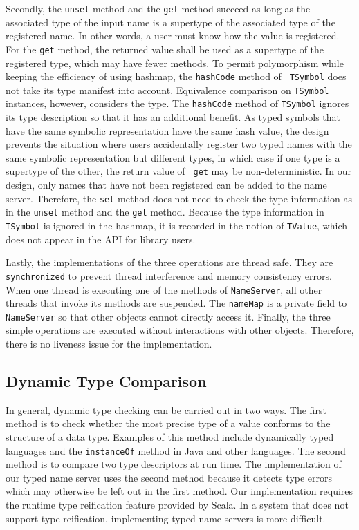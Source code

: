 Secondly, the {\tt unset} method and the {\tt get} method succeed as long as the 
associated type of the input name is a supertype of the associated type of the 
registered name.  In other words, a user must know how the value is registered. 
For the {\tt get} method, the returned value shall be used as a supertype of 
the registered type, which may have fewer methods. To permit polymorphism while 
keeping the efficiency of using hashmap, the {\tt hashCode} method of {\tt 
TSymbol} does not take its type manifest into account.  Equivalence comparison 
on {\tt TSymbol} instances, however, considers the type.  The {\tt hashCode} 
method of {\tt TSymbol} ignores its type description so that it has an 
additional benefit.  As typed symbols that have the same symbolic representation 
have the same hash value, the design prevents the situation where users 
accidentally register 
two typed names with the same symbolic representation but different types, 
in which case if one type is a supertype of the other, the return value of {\tt 
get} may be non-deterministic.  In our design, only names that have not been 
registered can be added to the name server.  Therefore, the {\tt set} method 
does not need to check the type information as in the {\tt unset} method and 
the {\tt get} method.  Because the type information in {\tt TSymbol} is ignored 
in the hashmap, it is recorded in the notion of {\tt TValue}, which 
does not appear in the API for library users.  

Lastly, the implementations of the three operations are thread safe.  They are 
{\tt synchronized} to prevent thread interference and memory consistency errors.
When one thread is executing one of the methods of {\tt NameServer}, all other 
threads that invoke its methods are suspended. The {\tt nameMap} is a private 
field to {\tt NameServer} so that other objects cannot directly access it.  
Finally, the three simple operations are executed without interactions with 
other objects.  Therefore, there is no liveness issue for the implementation.

\subsection{Dynamic Type Comparison}

In general, dynamic type checking can be carried out in two ways.  The first 
method is to check whether the most precise type of a value conforms to the
structure of a data type.  Examples of this method include dynamically typed
languages and the {\tt instanceOf} method in Java and other languages.  The
second method is to compare two type descriptors at run time.  The
implementation of our typed name server uses the second method because  
it detects type errors which may otherwise be left out in the first method.  Our
implementation requires the runtime type reification feature provided by Scala.
In a system that does not support type reification, implementing typed name 
servers is more difficult.



